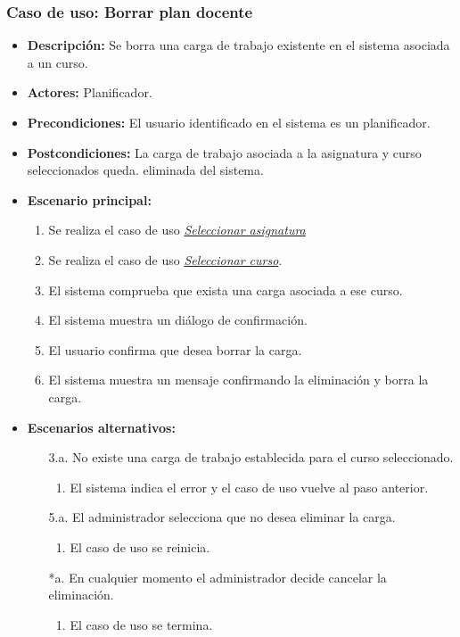 \subsubsection*{Caso de uso: Borrar plan docente}
\begin{itemize}
\item{\bf Descripción:} Se borra una carga de trabajo existente en el sistema asociada a un curso.
\item{\bf Actores:} Planificador.
\item{\bf Precondiciones:} El usuario identificado en el sistema es un planificador.
\item{\bf Postcondiciones:} La carga de trabajo asociada a la asignatura y curso seleccionados queda. eliminada del sistema.
\item{\bf Escenario principal:}
	\begin{enumerate}
	\item Se realiza el caso de uso {\em \hyperref[select_asignatura]{Seleccionar asignatura}}
	\item Se realiza el caso de uso {\em \hyperref[select_curso]{Seleccionar curso}}.
	\item El sistema comprueba que exista una carga asociada a ese curso.
	\item El sistema muestra un diálogo de confirmación.
	\item El usuario confirma que desea borrar la carga.
	\item El sistema muestra un mensaje confirmando la eliminación y borra la carga.
	\end{enumerate}
\item{\bf Escenarios alternativos:}
	\begin{itemize}
	\item[3.a.] No existe una carga de trabajo establecida para el curso seleccionado.
	  \begin{enumerate}
	  \item El sistema indica el error y el caso de uso vuelve al paso anterior.
	  \end{enumerate}
	\item[5.a.] El administrador selecciona que no desea eliminar la carga.
		\begin{enumerate}
		\item El caso de uso se reinicia.
		\end{enumerate}
	\item[*a.] En cualquier momento el administrador decide cancelar la eliminación.
		\begin{enumerate}
		\item El caso de uso se termina.
		\end{enumerate}
	\end{itemize}
\end{itemize}



